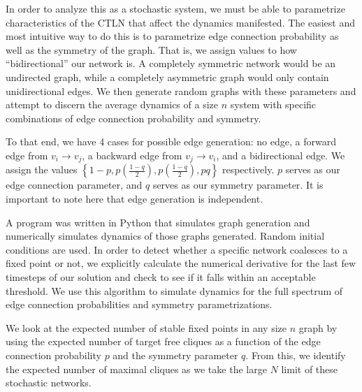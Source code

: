 In order to analyze this as a stochastic system, we must be able to parametrize characteristics of the CTLN that affect the dynamics manifested. The easiest and most intuitive way to do this is to parametrize edge connection probability as well as the symmetry of the graph. That is, we assign values to how ``bidirectional'' our network is. A completely symmetric network would be an undirected graph, while a completely asymmetric graph would only contain unidirectional edges. We then generate random graphs with these parameters and attempt to discern the average dynamics of a size $n$ system with specific combinations of edge connection probability and symmetry.

To that end, we have 4 cases for possible edge generation: no edge, a forward edge from $v_i\to v_j$, a backward edge from $v_j\to v_i$, and a bidirectional edge. We assign the values $\left\{1-p, p \left( \frac{1-q}{2}  \right), p \left( \frac{1-q}{2}  \right), pq \right\}$ respectively. $p$ serves as our edge connection parameter, and $q$ serves as our symmetry parameter. It is important to note here that edge generation is independent.

A program was written in Python that simulates graph generation and numerically simulates dynamics of those graphs generated. Random initial conditions are used. In order to detect whether a specific network coalesces to a fixed point or not, we explicitly calculate the numerical derivative for the last few timesteps of our solution and check to see if it falls within an acceptable threshold. We use this algorithm to simulate dynamics for the full spectrum of edge connection probabilities and symmetry parametrizations. 

We look at the expected number of stable fixed points in any size $n$ graph by using the expected number of target free cliques as a function of the edge connection probability $p$ and the symmetry parameter $q$. From this, we identify the expected number of maximal cliques as we take the large $N$ limit of these stochastic networks.